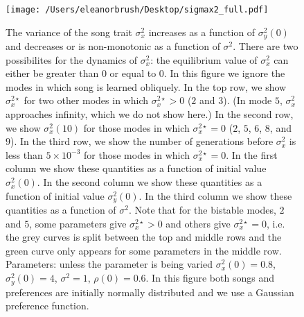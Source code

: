 \documentclass{article}
\begin{document}
\begin{figure}
\texttt{[image: /Users/eleanorbrush/Desktop/sigmax2\_full.pdf]}
\caption{\label{sigmax2_full} The variance of the song trait $\sigma_x^{2}$ increases as a function of $\sigma_y^2(0)$ and decreases or is non-monotonic as a function of $\sigma^2$. There are two possibilites for the dynamics of $\sigma_x^2$: the equilibrium value of $\sigma_x^2$ can either be greater than $0$ or equal to $0$. In this figure we ignore the modes in which song is learned obliquely. In the top row, we show $\sigma_x^{2\star}$ for two other modes in which $\sigma_x^{2\star}>0$ ($2$ and $3$). (In mode $5$, $\sigma_x^2$ approaches infinity, which we do not show here.) In the second row, we show $\sigma_x^2(10)$  for those modes in which $\sigma_x^{2\star}=0$ ($2$, $5$, $6$, $8$, and $9$). In the third row, we show the number of generations before $\sigma_x^2$ is less than $5\times10^{-3}$ for those modes in which $\sigma_x^{2\star}=0$. In the first column we show these quantities as a function of initial value $\sigma_x^{2}(0)$. In the second column we show these quantities as a function of initial value $\sigma_y^2(0)$. In the third column we show these quantities as a function of $\sigma^2$. Note that for the bistable modes, $2$ and $5$, some parameters give $\sigma_x^{2\star}>0$ and others give $\sigma_x^{2\star}=0$, i.e. the grey curves is split between the top and middle rows and the green curve only appears for some parameters in the middle row. Parameters: unless the parameter is being varied $\sigma_x^2(0)=0.8$, $\sigma_y^2(0)=4$, $\sigma^2=1$, $\rho(0)=0.6$. In this figure both songs and preferences are initially normally distributed and we use a Gaussian preference function. } 
\end{figure}
\end{document}

